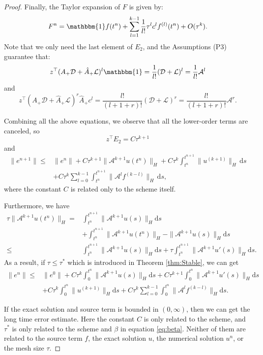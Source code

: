 \documentclass[a4paper, oneside]{book}
\def\calA{{\mathcal{A}}}
\def\rmd{{\mathrm{d}}}
\def\bbone{{\mathbbm{1}}}
\def\hatA{{\hat{A}}}
\def\calA{{\mathcal{A}}}
\def\calD{{\mathcal{D}}}
\def\calL{{\mathcal{L}}}
\def\As{{A_+}}
\def\Ahs{{\hatA_+}}
\begin{document}
\begin{proof}
Finally, the Taylor expansion of $F$ is given by:
$$F^n = \bbone f(t^n) + \sum_{l=1}^{k-1} \frac{1}{l!} \tau^l c^l f^{(l)}(t^n) + O(\tau^k).$$
Note that we only need the last element of $E_2$, and the Assumptions (P3) guarantee that:
$$z^\top (\As \calD + \Ahs \calL)^l \bbone = \frac{1}{l!} (\calD+\calL)^l = \frac{1}{l!} \calA^l$$
and
$$z^\top (\As \calD + \Ahs \calL)^r \Ahs c^l = \frac{l!}{(l+1+r)!} (\calD+\calL)^r = \frac{l!}{(l+1+r)!} \calA^r.$$

Combining all the above equations, we observe that all the lower-order terms are canceled, so 
$$z^\top E_2 = C \tau^{k+1}$$
and
\begin{equation*}
\begin{aligned}
\|e^{n+1}\| \leq & \|e^n\| + C\tau^{k+1} \|\calA^{k+1}u(t^n)\|_H  + C\tau^k \int_{t^n}^{t^{n+1}}\|u^{(k+1)}\|_H \, \rmd s \\
& + C\tau^k \sum_{l=0}^{k-1} \int_{t^n}^{t^{n+1}}\|\calA^l f^{(k-l)}\|_H \, \rmd s,
\end{aligned}
\end{equation*}
where the constant $C$ is related only to the scheme itself.

Furthermore, we have
\begin{align*}
\tau\|\calA^{k+1}u(t^n)\|_H =& \int_{t^n}^{t^{n+1}}\|\calA^{k+1}u(s)\|_H\rmd s \\
&+ \int_{t^n}^{t^{n+1}}\|\calA^{k+1}u(t^n)\|_H- \|\calA^{k+1}u(s)\|_H \rmd s \\
\leq&  \int_{t^n}^{t^{n+1}}\|\calA^{k+1}u(s)\|_H\rmd s + \tau \int_{t^n}^{t^{n+1}}\|\calA^{k+1}u'(s)\|_H\rmd s.
\end{align*}
As a result, if $\tau \leq \tau^*$ {which is introduced in Theorem \ref{thm:Stable}}, we can get
\begin{align*}\|e^{n}\| \leq& \|e^0\| + 
    C\tau^{k} \int_{0}^{t^{n}}\|\calA^{k+1}u(s)\|_H\rmd s + C\tau^{k+1} \int_{0}^{t^{n}}\|\calA^{k+1}u'(s)\|_H\rmd s  \\
    &+C\tau^k \int_{0}^{t^{n}}\|u^{(k+1)}\|_H \rmd s 
    + C\tau^k \sum_{l=0}^{k-1} \int_{0}^{t^{n}}\|\calA^lf^{(k-l)}\|_H\rmd s
    .
    \end{align*}

If the exact solution and source term is bounded in $(0, \infty)$, then 
we can get the long time error estimate. 
Here the constant $C$ is only related to the scheme, 
and $\tau^*$ is only
related to the scheme and $\beta$ in equation \eqref{eq:beta}. 
Neither of them are related to the source term $f$,
the exact solution $u$, 
the numerical solution $u^n$, 
or the mesh size $\tau$.     
\end{proof}
\end{document}
